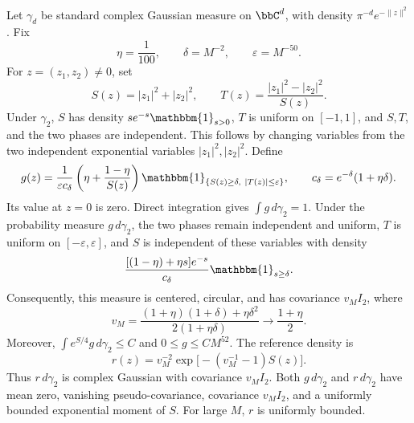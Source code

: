 \documentclass[11pt,reqno]{amsart}
\begin{document}
Let $\gamma_d$ be standard complex Gaussian measure on $\bbC^d$, with density $\pi^{-d}e^{-\|z\|^2}$. Fix
\[
 \eta=\frac1{100},\qquad \delta=M^{-2},\qquad \varepsilon=M^{-50}.
\]
For $z=(z_1,z_2)\ne0$, set
\[
 S(z)=|z_1|^2+|z_2|^2,\qquad
 T(z)=\frac{|z_1|^2-|z_2|^2}{S(z)}.
\]
Under $\gamma_2$, $S$ has density $s e^{-s}\mathbbm{1}_{s>0}$, $T$ is uniform on $[-1,1]$, and $S,T$, and the two phases are independent. This follows by changing variables from the two independent exponential variables $|z_1|^2,|z_2|^2$.
Define
\begin{equation}\label{eq:g}
 g(z)=\frac{1}{\varepsilon c_\delta}
 \left(\eta+\frac{1-\eta}{S(z)}\right)
 \mathbbm{1}_{\{S(z)\ge\delta,\ |T(z)|\le\varepsilon\}},
 \qquad c_\delta=e^{-\delta}(1+\eta\delta).
\end{equation}
Its value at $z=0$ is zero. Direct integration gives $\int g\,d\gamma_2=1$. Under the probability measure $g\,d\gamma_2$, the two phases remain independent and uniform, $T$ is uniform on $[-\varepsilon,\varepsilon]$, and $S$ is independent of these variables with density
\begin{equation}\label{eq:radial}
 \frac{[(1-\eta)+\eta s]e^{-s}}{c_\delta}\mathbbm{1}_{s\ge\delta}.
\end{equation}
Consequently, this measure is centered, circular, and has covariance $v_M I_2$, where
\begin{equation}\label{eq:variance}
 v_M=\frac{(1+\eta)(1+\delta)+\eta\delta^2}{2(1+\eta\delta)}
 \longrightarrow \frac{1+\eta}{2}.
\end{equation}
Moreover, $\int e^{S/4}g\,d\gamma_2\le C$ and $0\le g\le C M^{52}$. The reference density is
\begin{equation}\label{eq:r}
 r(z)=v_M^{-2}\exp\bigl[-(v_M^{-1}-1)S(z)\bigr].
\end{equation}
Thus $r\,d\gamma_2$ is complex Gaussian with covariance $v_M I_2$. Both $g\,d\gamma_2$ and $r\,d\gamma_2$ have mean zero, vanishing pseudo-covariance, covariance $v_M I_2$, and a uniformly bounded exponential moment of $S$. For large $M$, $r$ is uniformly bounded.
\end{document}
